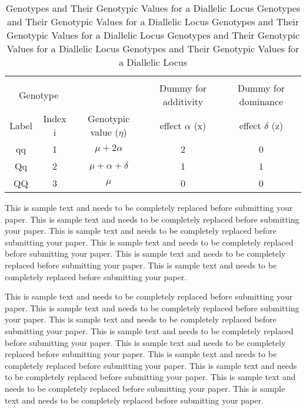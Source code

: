 \documentclass[11pt]{asaproc}
\begin{document}
\begin{table}
\caption{Genotypes and Their Genotypic Values for a Diallelic Locus Genotypes and Their Genotypic Values for a Diallelic Locus Genotypes and Their Genotypic Values for a Diallelic Locus Genotypes and Their Genotypic Values for a Diallelic Locus Genotypes and Their Genotypic Values for a Diallelic Locus }
\begin{center}
\begin{tabular}{ccccc}
\hline
\hline
\\[-5pt]
\multicolumn{2}{c}{Genotype} & &
\multicolumn{1}{c}{Dummy for additivity} &
\multicolumn{1}{c}{Dummy for dominance }\\
\multicolumn{1}{c}{Label} &    
\multicolumn{1}{c}{Index i} &
\multicolumn{1}{c}{Genotypic value ($\eta$)}&
\multicolumn{1}{c}{effect $\alpha$ (x)} &
\multicolumn{1}{c}{effect $\delta$ (z)}\\
\hline
qq      &1&     $\mu + \mbox{2}\alpha$  & 2&    0\\
Qq&     2&      $\mu + \alpha + \delta$&        1       &1\\
QQ&     3&      $\mu$&  0&      0\\
\hline
\end{tabular}
\end{center}
\end{table}

This is sample text and needs to be completely replaced before submitting your paper. This is sample text and needs to be completely replaced before submitting your paper. This is sample text and needs to be completely replaced before submitting your paper. This is sample text and needs to be completely replaced before submitting your paper. This is sample text and needs to be completely replaced before submitting your paper. This is sample text and needs to be completely replaced before submitting your paper.

This is sample text and needs to be completely replaced before submitting your paper. This is sample text and needs to be completely replaced before submitting your paper. This is sample text and needs to be completely replaced before submitting your paper. This is sample text and needs to be completely replaced before submitting your paper. This is sample text and needs to be completely replaced before submitting your paper. This is sample text and needs to be completely replaced before submitting your paper. This is sample text and needs to be completely replaced before submitting your paper. This is sample text and needs to be completely replaced before submitting your paper. This is sample text and needs to be completely replaced before submitting your paper. 
\end{document}
